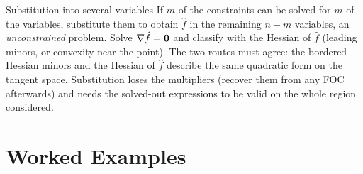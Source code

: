\begin{rulebox}{Substitution into several variables}
If $m$ of the constraints can be solved for $m$ of the variables, substitute
them to obtain $\hat f$ in the remaining $n-m$ variables, an
\emph{unconstrained} problem. Solve $\nabla\hat f=\mathbf{0}$ and classify
with the Hessian of $\hat f$ (leading minors, or convexity near the point).
The two routes must agree: the bordered-Hessian minors and the Hessian of
$\hat f$ describe the same quadratic form on the tangent space. Substitution
loses the multipliers (recover them from any FOC afterwards) and needs the
solved-out expressions to be valid on the whole region considered.
\end{rulebox}

\section{Worked Examples}

